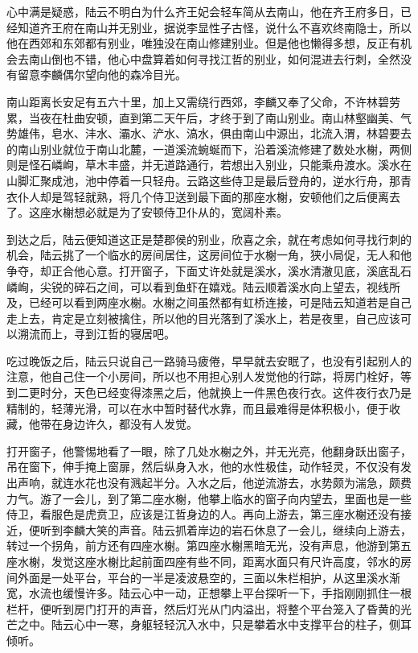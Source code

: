 心中满是疑惑，陆云不明白为什么齐王妃会轻车简从去南山，他在齐王府多日，已经知道齐王府在南山并无别业，据说李显性子古怪，说什么不喜欢终南隐士，所以他在西郊和东郊都有别业，唯独没在南山修建别业。但是他也懒得多想，反正有机会去南山倒也不错，他心中盘算着如何寻找江哲的别业，如何混进去行刺，全然没有留意李麟偶尔望向他的森冷目光。

南山距离长安足有五六十里，加上又需绕行西郊，李麟又奉了父命，不许林碧劳累，当夜在杜曲安顿，直到第二天午后，才终于到了南山别业。南山林壑幽美、气势雄伟，皂水、沣水、灞水、浐水、滈水，俱由南山中源出，北流入渭，林碧要去的南山别业就位于南山北麓，一道溪流蜿蜒而下，沿着溪流修建了数处水榭，两侧则是怪石嶙峋，草木丰盛，并无道路通行，若想出入别业，只能乘舟渡水。溪水在山脚汇聚成池，池中停着一只轻舟。云路这些侍卫是最后登舟的，逆水行舟，那青衣仆人却是驾轻就熟，将几个侍卫送到最下面的那座水榭，安顿他们之后便离去了。这座水榭想必就是为了安顿侍卫仆从的，宽阔朴素。

到达之后，陆云便知道这正是楚郡侯的别业，欣喜之余，就在考虑如何寻找行刺的机会，陆云挑了一个临水的房间居住，这房间位于水榭一角，狭小局促，无人和他争夺，却正合他心意。打开窗子，下面丈许处就是溪水，溪水清澈见底，溪底乱石嶙峋，尖锐的碎石之间，可以看到鱼虾在嬉戏。陆云顺着溪水向上望去，视线所及，已经可以看到两座水榭。水榭之间虽然都有虹桥连接，可是陆云知道若是自己走上去，肯定是立刻被擒住，所以他的目光落到了溪水上，若是夜里，自己应该可以溯流而上，寻到江哲的寝居吧。

吃过晚饭之后，陆云只说自己一路骑马疲倦，早早就去安眠了，也没有引起别人的注意，他自己住一个小房间，所以也不用担心别人发觉他的行踪，将房门栓好，等到二更时分，天色已经变得漆黑之后，他就换上一件黑色夜行衣。这件夜行衣乃是精制的，轻薄光滑，可以在水中暂时替代水靠，而且最难得是体积极小，便于收藏，他带在身边许久，都没有人发觉。

打开窗子，他警惕地看了一眼，除了几处水榭之外，并无光亮，他翻身跃出窗子，吊在窗下，伸手掩上窗扉，然后纵身入水，他的水性极佳，动作轻灵，不仅没有发出声响，就连水花也没有溅起半分。入水之后，他逆流游去，水势颇为湍急，颇费力气。游了一会儿，到了第二座水榭，他攀上临水的窗子向内望去，里面也是一些侍卫，看服色是虎贲卫，应该是江哲身边的人。再向上游去，第三座水榭还没有接近，便听到李麟大笑的声音。陆云抓着岸边的岩石休息了一会儿，继续向上游去，转过一个拐角，前方还有四座水榭。第四座水榭黑暗无光，没有声息，他游到第五座水榭，发觉这座水榭比起前面四座有些不同，距离水面只有尺许高度，邻水的房间外面是一处平台，平台的一半是凌波悬空的，三面以朱栏相护，从这里溪水渐宽，水流也缓慢许多。陆云心中一动，正想攀上平台探听一下，手指刚刚抓住一根栏杆，便听到房门打开的声音，然后灯光从门内溢出，将整个平台笼入了昏黄的光芒之中。陆云心中一寒，身躯轻轻沉入水中，只是攀着水中支撑平台的柱子，侧耳倾听。


